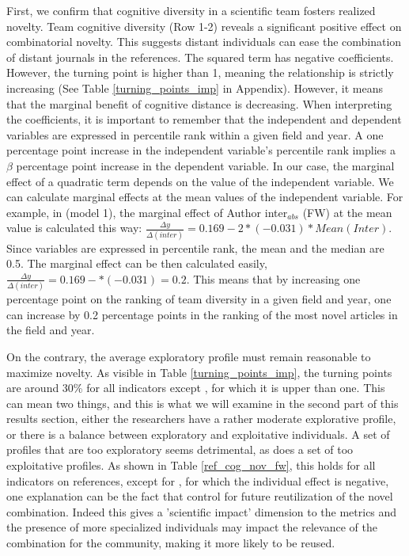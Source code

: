 First, we confirm that cognitive diversity in a scientific team fosters realized novelty.
Team cognitive diversity (Row 1-2) reveals a significant positive effect on combinatorial novelty. This suggests distant individuals can ease the combination of distant journals in the references. The squared term has negative coefficients. However, the turning point is higher than 1, meaning the relationship is strictly increasing (See Table \ref{turning_points_imp} in Appendix). However, it means that the marginal benefit of cognitive distance is decreasing. 
When interpreting the coefficients, it is important to remember that the independent and dependent variables are expressed in percentile rank within a given field and year. A one percentage point increase in the independent variable's percentile rank implies a $\beta$ percentage point increase in the dependent variable. In our case, the marginal effect of a quadratic term depends on the value of the independent variable. We can calculate marginal effects at the mean values of the independent variable. For example, in \cite{uzzi2013atypical} (model 1), the marginal effect of Author inter$_{abs}$ (FW) at the mean value is calculated this way: $\frac{\Delta y}{\Delta(inter)} = 0.169 - 2 * (-0.031) * Mean(Inter)$. Since variables are expressed in percentile rank, the mean and the median are 0.5. The marginal effect can be then calculated easily, $\frac{\Delta y}{\Delta(inter)} = 0.169 - * (-0.031) = 0.2$. This means that by increasing one percentage point on the ranking of team diversity in a given field and year, one can increase by 0.2 percentage points in the ranking of the most novel articles in the field and year.

On the contrary, the average exploratory profile must remain reasonable to maximize novelty. As visible in Table \ref{turning_points_imp}, the turning points are around 30\% for all indicators except \cite{shibayama2021measuring}, for which it is upper than one. This can mean two things, and this is what we will examine in the second part of this results section, either the researchers have a rather moderate explorative profile, or there is a balance between exploratory and exploitative individuals. A set of profiles that are too exploratory seems detrimental, as does a set of too exploitative profiles. As shown in Table \ref{ref_cog_nov_fw}, this holds for all indicators on references, except for \cite{wang2017bias}, for which the individual effect is negative, one explanation can be the fact that \cite{wang2017bias} control for future reutilization of the novel combination. Indeed this gives a 'scientific impact' dimension to the metrics and the presence of more specialized individuals may impact the relevance of the combination for the community, making it more likely to be reused.

